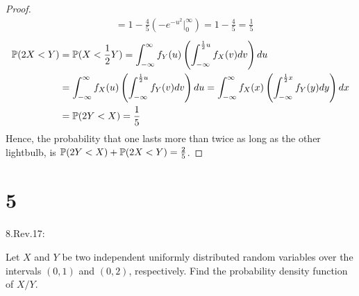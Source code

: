\documentclass{article}
\begin{document}
\begin{proof}
\begin{align}
        &= 1-\frac{4}{5}\left(-e^{-u^2}\bigg|_{0}^{\infty}\right) = 1-\frac{4}{5}=\frac{1}{5}
    \end{align}
    \begin{align}
        \mathbb{P}(2X<Y) &= \mathbb{P}(X<\frac{1}{2}Y) = \int_{-\infty}^{\infty}f_Y(u)\left(\int_{-\infty}^{\frac{1}{2}u}f_X(v)dv\right) du\\
        &= \int_{-\infty}^{\infty}f_X(u)\left(\int_{-\infty}^{\frac{1}{2}u}f_Y(v)dv\right) du = \int_{-\infty}^{\infty}f_X(x)\left(\int_{-\infty}^{\frac{1}{2}x}f_Y(y)dy\right) dx\\
        &= \mathbb{P}(2Y<X) = \frac{1}{5}
    \end{align}
    Hence, the probability that one lasts more than twice as long as the other lightbulb, is $\mathbb{P}(2Y<X)+\mathbb{P}(2X<Y)=\frac{2}{5}$.
\end{proof}

\newpage

\section*{5}
\begin{ques}\label{q5}
    8.Rev.17:

    Let $X$ and $Y$ be two independent uniformly distributed random variables over the intervals $(0,1)$ and $(0,2)$, respectively. Find the probability density function of $X/Y$.
\end{ques}
\end{document}

